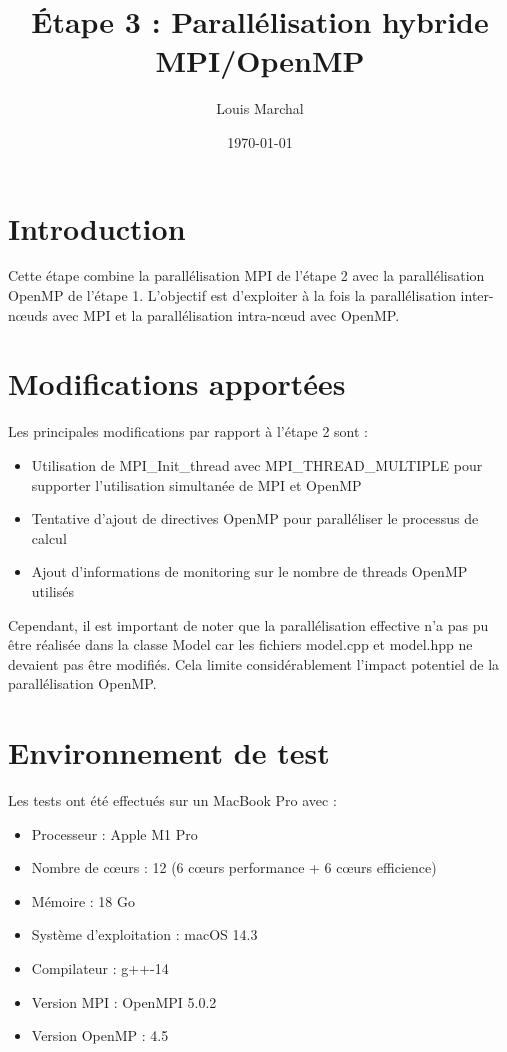 \documentclass[11pt]{article}
\title{Étape 3 : Parallélisation hybride MPI/OpenMP}
\author{Louis Marchal}
\date{\today}
\begin{document}
\maketitle

\section{Introduction}
Cette étape combine la parallélisation MPI de l'étape 2 avec la parallélisation OpenMP de l'étape 1. L'objectif est d'exploiter à la fois la parallélisation inter-nœuds avec MPI et la parallélisation intra-nœud avec OpenMP.

\section{Modifications apportées}
Les principales modifications par rapport à l'étape 2 sont :

\begin{itemize}
    \item Utilisation de MPI\_Init\_thread avec MPI\_THREAD\_MULTIPLE pour supporter l'utilisation simultanée de MPI et OpenMP
    \item Tentative d'ajout de directives OpenMP pour paralléliser le processus de calcul
    \item Ajout d'informations de monitoring sur le nombre de threads OpenMP utilisés
\end{itemize}

Cependant, il est important de noter que la parallélisation effective n'a pas pu être réalisée dans la classe Model car les fichiers model.cpp et model.hpp ne devaient pas être modifiés. Cela limite considérablement l'impact potentiel de la parallélisation OpenMP.

\section{Environnement de test}
Les tests ont été effectués sur un MacBook Pro avec :
\begin{itemize}
    \item Processeur : Apple M1 Pro
    \item Nombre de cœurs : 12 (6 cœurs performance + 6 cœurs efficience)
    \item Mémoire : 18 Go
    \item Système d'exploitation : macOS 14.3
    \item Compilateur : g++-14
    \item Version MPI : OpenMPI 5.0.2
    \item Version OpenMP : 4.5
\end{itemize}
\end{document}
